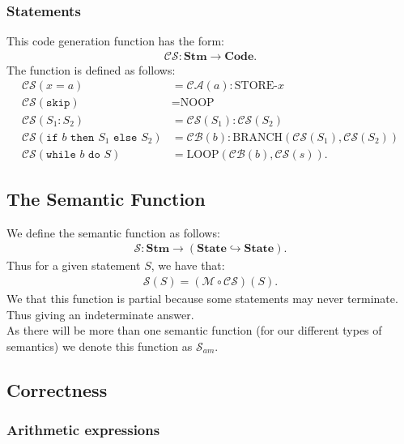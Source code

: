 \documentclass[a4paper, 12pt, twoside]{article}
\begin{document}
\subsubsection{Statements}

This code generation function has the form: \begin{gather*}
  \mathcal{CS} : \textbf{Stm} \to \textbf{Code}.
\end{gather*} The function is defined as follows: \begin{align*}
  \mathcal{CS}(x = a) &= \mathcal{CA}(a):\text{STORE-}x \\
  \mathcal{CS}(\texttt{skip}) &= \text{NOOP} \\
  \mathcal{CS}(S_1:S_2) &= \mathcal{CS}(S_1):\mathcal{CS}(S_2) \\
  \mathcal{CS}(
    \texttt{if } b \texttt{ then } S_1 \texttt{ else } S_2
  ) &= \mathcal{CB}(b):\text{BRANCH}(\mathcal{CS}(S_1), \mathcal{CS}(S_2)) \\
  \mathcal{CS}(
    \texttt{while } b \texttt{ do } S
  ) &= \text{LOOP}(\mathcal{CB}(b), \mathcal{CS}(s)).
\end{align*}

\subsection{The Semantic Function}

We define the semantic function as follows: \begin{gather*}
  \mathcal{S}: \textbf{Stm} \to (\textbf{State} \hookrightarrow \textbf{State}).
\end{gather*} Thus for a given statement $S$, we have that: \begin{gather*}
  \mathcal{S}(S) = (\mathcal{M} \circ \mathcal{CS})(S).
\end{gather*} We that this function is partial because some statements
may never terminate. Thus giving an indeterminate answer.
\\[\baselineskip]
As there will be more than one semantic function (for our different types
of semantics) we denote this function as $\mathcal{S}_{am}$.

\subsection{Correctness}

\subsubsection{Arithmetic expressions}
\end{document}
